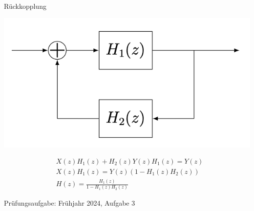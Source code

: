 \documentclass[14pt, aspectratio=169, handout]{beamer}
\begin{document}
\begin{frame}{Rückkopplung}
        \begin{minipage}[t]{0.45\textwidth}
            \includegraphics[width=\linewidth]{figures/Rueckkopplung.png}
        \end{minipage}
        \hfill
        \begin{minipage}[c]{0.45\textwidth}
            \small{
            \begin{align*}
                &X(z)H_1(z) + H_2(z)Y(z)H_1(z) = Y(z) \\
                &X(z)H_1(z) = Y(z)(1-H_1(z)H_2(z)) \\
                &H(z)=\frac{H_1(z)}{1-H_1(z)H_2(z)}
            \end{align*}}
            \vspace*{3.45cm}
        \end{minipage}
        \vspace*{-3.5cm}
\end{frame}

\begin{frame}{Prüfungsaufgabe: Frühjahr 2024, Aufgabe 3}
    
\end{frame}
\end{document}
